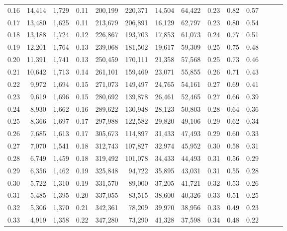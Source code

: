 \begin{tabular}{rrrrrrrrrrrrrr}
0.16 &  14,414 &  1,729 &  0.11 &  200,199 &  220,371 &  14,504 &  64,422 &  0.23 &  0.82 &      0.57 \\
0.17 &  13,480 &  1,625 &  0.11 &  213,679 &  206,891 &  16,129 &  62,797 &  0.23 &  0.80 &      0.54 \\
0.18 &  13,188 &  1,724 &  0.12 &  226,867 &  193,703 &  17,853 &  61,073 &  0.24 &  0.77 &      0.51 \\
0.19 &  12,201 &  1,764 &  0.13 &  239,068 &  181,502 &  19,617 &  59,309 &  0.25 &  0.75 &      0.48 \\
0.20 &  11,391 &  1,741 &  0.13 &  250,459 &  170,111 &  21,358 &  57,568 &  0.25 &  0.73 &      0.46 \\
0.21 &  10,642 &  1,713 &  0.14 &  261,101 &  159,469 &  23,071 &  55,855 &  0.26 &  0.71 &      0.43 \\
0.22 &   9,972 &  1,694 &  0.15 &  271,073 &  149,497 &  24,765 &  54,161 &  0.27 &  0.69 &      0.41 \\
0.23 &   9,619 &  1,696 &  0.15 &  280,692 &  139,878 &  26,461 &  52,465 &  0.27 &  0.66 &      0.39 \\
0.24 &   8,930 &  1,662 &  0.16 &  289,622 &  130,948 &  28,123 &  50,803 &  0.28 &  0.64 &      0.36 \\
0.25 &   8,366 &  1,697 &  0.17 &  297,988 &  122,582 &  29,820 &  49,106 &  0.29 &  0.62 &      0.34 \\
0.26 &   7,685 &  1,613 &  0.17 &  305,673 &  114,897 &  31,433 &  47,493 &  0.29 &  0.60 &      0.33 \\
0.27 &   7,070 &  1,541 &  0.18 &  312,743 &  107,827 &  32,974 &  45,952 &  0.30 &  0.58 &      0.31 \\
0.28 &   6,749 &  1,459 &  0.18 &  319,492 &  101,078 &  34,433 &  44,493 &  0.31 &  0.56 &      0.29 \\
0.29 &   6,356 &  1,462 &  0.19 &  325,848 &   94,722 &  35,895 &  43,031 &  0.31 &  0.55 &      0.28 \\
0.30 &   5,722 &  1,310 &  0.19 &  331,570 &   89,000 &  37,205 &  41,721 &  0.32 &  0.53 &      0.26 \\
0.31 &   5,485 &  1,395 &  0.20 &  337,055 &   83,515 &  38,600 &  40,326 &  0.33 &  0.51 &      0.25 \\
0.32 &   5,306 &  1,370 &  0.21 &  342,361 &   78,209 &  39,970 &  38,956 &  0.33 &  0.49 &      0.23 \\
0.33 &   4,919 &  1,358 &  0.22 &  347,280 &   73,290 &  41,328 &  37,598 &  0.34 &  0.48 &      0.22 \\

\end{tabular}
